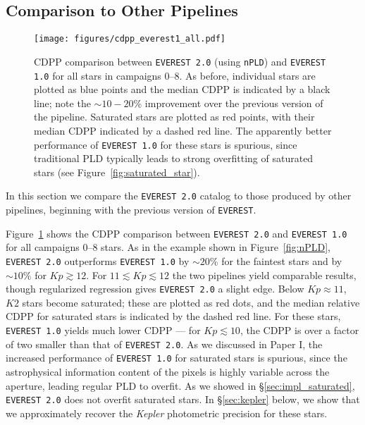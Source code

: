 \documentclass[]{emulateapj}
\newcommand{\Kp}{\ensuremath{Kp}}
\begin{document}
\subsection{Comparison to Other Pipelines}
\label{sec:comparison}

\begin{figure}[hbt]
  \begin{center}
      \texttt{[image: figures/cdpp\_everest1\_all.pdf]}
       \caption{CDPP comparison between \texttt{EVEREST 2.0} (using \texttt{nPLD}) and \texttt{EVEREST 1.0} for all stars in campaigns 0--8.
       As before, individual stars are plotted as blue points and the median CDPP is indicated by a black line; note
       the ${\sim}10-20$\% improvement over the previous version of the pipeline. Saturated
       stars are plotted as red points, with their median CDPP indicated by a dashed red line. The apparently
       better performance of \texttt{EVEREST 1.0} for these stars is spurious, since traditional PLD typically
       leads to strong overfitting of saturated stars (see Figure~\ref{fig:saturated_star}).}
     \label{fig:cdpp_everest1_all}
  \end{center}
\end{figure}

In this section we compare the \texttt{EVEREST 2.0} catalog to those produced by other pipelines, beginning with the
previous version of \texttt{EVEREST}.

Figure~\ref{fig:cdpp_everest1_all} shows the CDPP comparison between \texttt{EVEREST 2.0} and
\texttt{EVEREST 1.0} for all campaigns 0--8 stars. As in the example shown in Figure~\ref{fig:nPLD},
\texttt{EVEREST 2.0} outperforms \texttt{EVEREST 1.0} by ${\sim}20\%$ for the faintest stars and by
${\sim}10\%$ for $\Kp \gtrsim 12$. For $11 \lesssim \Kp \lesssim 12$ the two pipelines yield
comparable results, though regularized regression gives \texttt{EVEREST 2.0} a slight edge. Below
$\Kp \approx 11$, $K2$ stars become saturated; these are plotted as red dots, and the median
relative CDPP for saturated stars is indicated by the dashed red line. For these stars,
\texttt{EVEREST 1.0} yields much lower CDPP --- for $\Kp \lesssim 10$, the CDPP is over a factor
of two smaller than that of \texttt{EVEREST 2.0}. As we discussed in Paper I, the increased
performance of \texttt{EVEREST 1.0} for saturated stars is spurious, since the astrophysical
information content of the pixels is highly variable across the aperture, leading regular
PLD to overfit. As we showed in \S\ref{sec:impl_saturated}, \texttt{EVEREST 2.0} does not 
overfit saturated stars. In \S\ref{sec:kepler} below, we show that we approximately recover
the \emph{Kepler} photometric precision for these stars.
\end{document}
